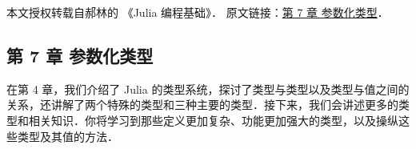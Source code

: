 
本文授权转载自郝林的 《Julia 编程基础》． 原文链接：\href{https://github.com/hyper0x/JuliaBasics/blob/master/book/ch07.md}{第 7 章 参数化类型}．


\subsection{第 7 章 参数化类型}

在第 4 章，我们介绍了 Julia 的类型系统，探讨了类型与类型以及类型与值之间的关系，还讲解了两个特殊的类型和三种主要的类型．接下来，我们会讲述更多的类型和相关知识．你将学习到那些定义更加复杂、功能更加强大的类型，以及操纵这些类型及其值的方法．